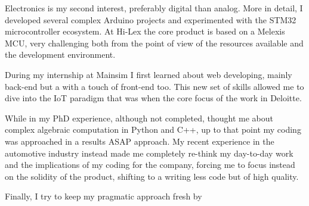 \documentclass[11 pt,oneside,a4paper,titlepage]{article}
\begin{document}
{\begin{minipage}{11.3cm}
    Electronics is my second interest, preferably digital than analog. More in detail, I developed 
    several complex Arduino projects and experimented with the STM32 microcontroller ecosystem. 
    At Hi-Lex the core product is based on a Melexis MCU, very challenging both from the point 
    of view of the resources available and the development environment.
    
    During my internship at Mainsim I first learned about web developing, mainly back-end but a with 
    a touch of front-end too. This new set of skills allowed me to dive into the IoT paradigm that 
    was when the core focus of the work in Deloitte.
    
    While in my PhD experience, although not completed, thought me about complex algebraic computation 
    in Python and C++, up to that point my coding was approached in a results ASAP approach. 
    My recent experience in the automotive industry instead made me completely re-think 
    my day-to-day work and the implications of my coding for the company, forcing me to focus instead 
    on the solidity of the product, shifting to a writing less code but of high quality.
    
    Finally, I try to keep my pragmatic approach fresh by 


        

    
    

\end{minipage}}
\end{document}
